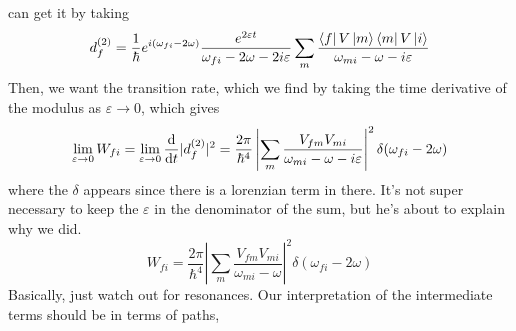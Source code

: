 \documentclass{article}
\theoremstyle{definition}
\begin{document}
can get it by taking \begin{equation} d_f^{(2)}=\frac{1}{\hbar}e^{i(\omega_{fi}-2\omega)}\frac{e^{2\varepsilon t}}{\omega_{fi}-2\omega-2i\varepsilon}\sum_{m}^{}\frac{\bra{f}V\ket{m}\bra{m}V\ket{i}}{\omega_{mi}-\omega-i\varepsilon} \end{equation} Then, we want the transition rate, which we find by taking the time derivative of the modulus as $\varepsilon\rightarrow 0$, which gives \begin{equation} \lim_{\varepsilon\rightarrow 0}W_{fi}=\lim_{\varepsilon\rightarrow 0}\dv{t}|d_f^{(2)}|^2=\frac{2\pi}{\hbar^4}\left|\sum_{m}^{}\frac{V_{fm}V_{mi}}{\omega_{mi}-\omega-i\varepsilon}\right|^2\delta(\omega_{fi}-2\omega) \end{equation} where the $\delta$ appears since there is a lorenzian term in there. It's not super necessary to keep the $\varepsilon$ in the denominator of the sum, but he's about to explain why we did. \begin{equation} W_{fi}=\frac{2\pi}{\hbar^4} \left| \sum_{m}^{}\frac{V_{fm}V_{mi}}{\omega_{mi}-\omega} \right|^2 \delta(\omega_{fi}-2\omega) \end{equation} Basically, just watch out for resonances. Our interpretation of the intermediate terms should be in terms of paths, \begin{center}  \end{center}
\end{document}
